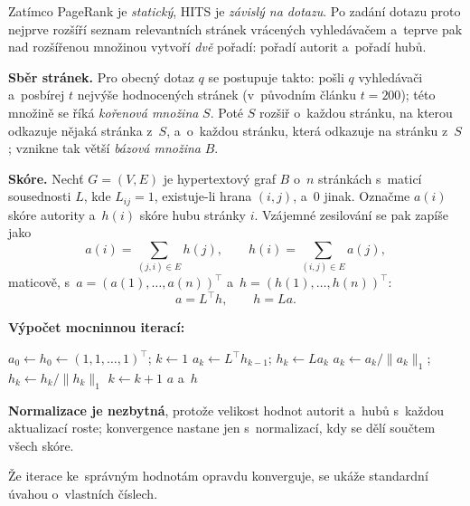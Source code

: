\documentclass[11pt,a4paper]{article}
\theoremstyle{definition}
\begin{document}
\begin{defbox}
Zatímco PageRank je \emph{statický}, HITS je \emph{závislý na dotazu}. Po zadání dotazu proto
nejprve rozšíří seznam relevantních stránek vrácených vyhledávačem a~teprve pak nad rozšířenou
množinou vytvoří \emph{dvě} pořadí: pořadí autorit a~pořadí hubů.

\textbf{Sběr stránek.} Pro obecný dotaz $q$ se postupuje takto: pošli $q$ vyhledávači a~posbírej
$t$ nejvýše hodnocených stránek (v~původním článku $t=200$); této množině se říká
\emph{kořenová množina} $S$. Poté $S$ rozšiř o~každou stránku, na kterou odkazuje nějaká
stránka z~$S$, a~o~každou stránku, která odkazuje na stránku z~$S$; vznikne tak větší
\emph{bázová množina} $B$.

\textbf{Skóre.} Nechť $G=(V,E)$ je hypertextový graf $B$ o~$n$ stránkách s~maticí sousednosti
$L$, kde $L_{ij}=1$, existuje-li hrana $(i,j)$, a~0 jinak. Označme $a(i)$ skóre autority
a~$h(i)$ skóre hubu stránky $i$. Vzájemné zesilování se pak zapíše jako
\[ a(i)=\sum_{(j,i)\in E}h(j),\qquad h(i)=\sum_{(i,j)\in E}a(j), \]
maticově, s~$a=(a(1),\dots,a(n))^{\!\top}$ a~$h=(h(1),\dots,h(n))^{\!\top}$:
\[ a=L^{\!\top}h,\qquad h=La. \]

\textbf{Výpočet mocninnou iterací:}
\begin{algorithmic}[1]
\State $a_0\gets h_0\gets (1,1,\dots,1)^{\!\top}$; $k\gets 1$
\Repeat
  \State $a_k\gets L^{\!\top}h_{k-1}$; \quad $h_k\gets La_k$
  \State $a_k\gets a_k/\|a_k\|_1$; \quad $h_k\gets h_k/\|h_k\|_1$ 
  \State $k\gets k+1$
\State \Return $a$ a~$h$
\end{algorithmic}
\textbf{Normalizace je nezbytná}, protože velikost hodnot autorit a~hubů s~každou aktualizací
roste; konvergence nastane jen s~normalizací, kdy se dělí součtem všech skóre.
\end{defbox}

Že iterace ke~správným hodnotám opravdu konverguje, se ukáže standardní úvahou o~vlastních
číslech.
\end{document}
